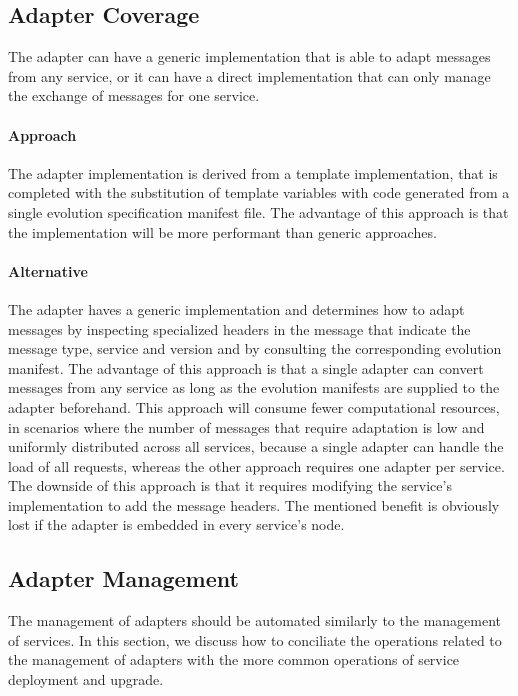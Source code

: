 \subsection{Adapter Coverage} %
\label{sec:adapter_polymorphism}

The adapter can have a generic implementation that is able to adapt messages from any service, or it can
have a direct implementation that can only manage the exchange of messages for one service.

\paragraph{Approach}
The adapter implementation is derived from a template implementation,
that is completed with the substitution of template variables with code generated from a single evolution specification manifest file.
The advantage of this approach is that the implementation will be more performant than generic approaches.

\paragraph{Alternative}
The adapter haves a generic implementation and determines how to adapt messages by inspecting specialized headers in the
message that indicate the message type, service and version and by consulting the corresponding evolution manifest.
The advantage of this approach is that a single adapter can convert messages from any service as long as the evolution manifests are supplied to the adapter beforehand.
This approach will consume fewer computational resources, in scenarios where the number of messages that require adaptation is low and uniformly distributed across all services,
because a single adapter can handle the load of all requests, whereas the other approach requires one adapter per service.
The downside of this approach is that it requires modifying the service's implementation to add the message headers.
The mentioned benefit is obviously lost if the adapter is embedded in every service's node.

\subsection{Adapter Management} %
\label{sec:adapter_management}

The management of adapters should be automated similarly to the management of services.
In this section, we discuss how to conciliate the operations related to the management of adapters with the more common operations of service deployment and upgrade.

